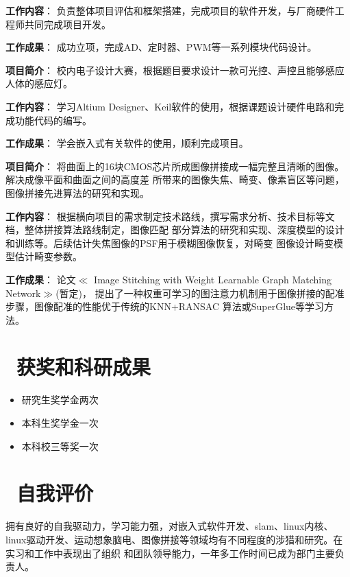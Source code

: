 \documentclass{resume}
\begin{document}
\textcolor[RGB]{80,100,190}{\textbf{工作内容}}：
负责整体项目评估和框架搭建，完成项目的软件开发，与厂商硬件工程师共同完成项目开发。

\textcolor[RGB]{80,100,190}{\textbf{工作成果}}：
成功立项，完成AD、定时器、PWM等一系列模块代码设计。


\textcolor[RGB]{80,100,190}{\textbf{项目简介}}：
校内电子设计大赛，根据题目要求设计一款可光控、声控且能够感应人体的感应灯。

\textcolor[RGB]{80,100,190}{\textbf{工作内容}}：
学习Altium Designer、Keil软件的使用，根据课题设计硬件电路和完成功能代码的编写。

\textcolor[RGB]{80,100,190}{\textbf{工作成果}}：
学会嵌入式有关软件的使用，顺利完成项目。

\textcolor[RGB]{80,100,190}{\textbf{项目简介}}：
将曲面上的16块CMOS芯片所成图像拼接成一幅完整且清晰的图像。解决成像平面和曲面之间的高度差
所带来的图像失焦、畸变、像素盲区等问题，图像拼接先进算法的研究和实现。

\textcolor[RGB]{80,100,190}{\textbf{工作内容}}：
根据横向项目的需求制定技术路线，撰写需求分析、技术目标等文档，整体拼接算法路线制定，图像匹配
部分算法的研究和实现、深度模型的设计和训练等。后续估计失焦图像的PSF用于模糊图像恢复，对畸变
图像设计畸变模型估计畸变参数。

\textcolor[RGB]{80,100,190}{\textbf{工作成果}}：
论文$\ll$ Image Stitching with Weight Learnable Graph Matching Network$\gg$(暂定)，
提出了一种权重可学习的图注意力机制用于图像拼接的配准步骤，图像配准的性能优于传统的KNN+RANSAC
算法或SuperGlue等学习方法。
\\

\section{\textcolor[RGB]{50,50,190}{\faPaperPlane\ 获奖和科研成果}}
\begin{itemize}
  \item 研究生奖学金两次
  \item 本科生奖学金一次
  \item 本科校三等奖一次
\end{itemize}

\section{\textcolor[RGB]{50,50,190}{\faChild\ 自我评价}}
拥有良好的自我驱动力，学习能力强，对嵌入式软件开发、slam、linux内核、
linux驱动开发、运动想象脑电、图像拼接等领域均有不同程度的涉猎和研究。在实习和工作中表现出了组织
和团队领导能力，一年多工作时间已成为部门主要负责人。



%
%
\end{document}
